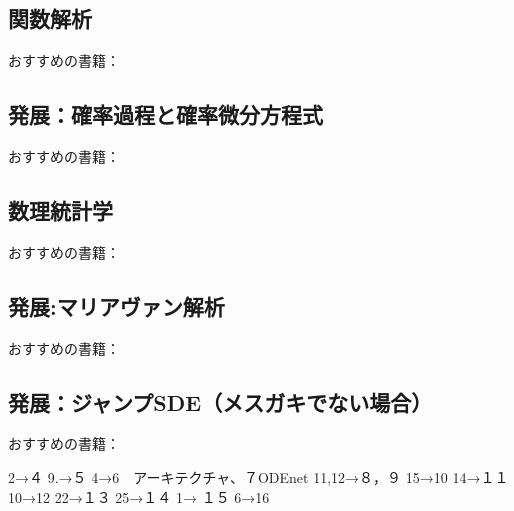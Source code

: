 \documentclass{jsarticle}
\begin{document}
\subsection{関数解析}
おすすめの書籍：

\subsection{発展：確率過程と確率微分方程式}
おすすめの書籍：

\subsection{数理統計学}
おすすめの書籍：





\subsection{発展:マリアヴァン解析}
おすすめの書籍：

\subsection{発展：ジャンプSDE（メスガキでない場合）}
おすすめの書籍：




2→４
9.→５
4→6　アーキテクチャ、７ODEnet
11,12→８，９
15→10
14→１１
10→12
22→１３
25→１４
1→  １５
6→16
\newpage
\end{document}
